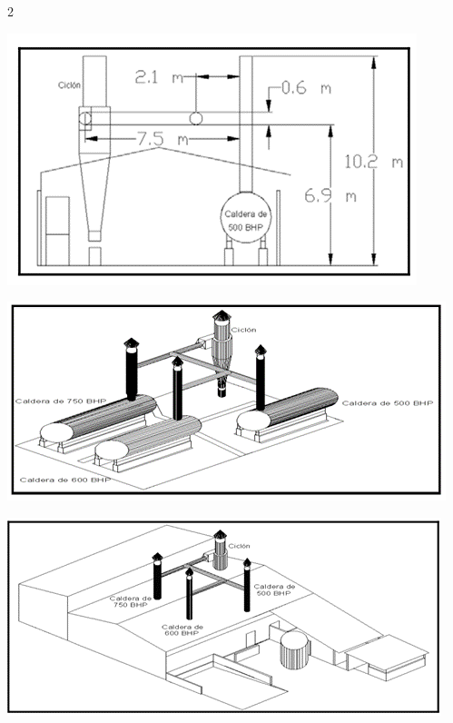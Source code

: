 \documentclass[12pt,spanish,Letterpaper,openany]{book}
\begin{document}
\begin {multicols}{2}
\begin {flushleft}
\begin{minipage}[c]{\columnwidth}
\centering

\includegraphics[width=1\linewidth]{images/image15_wvaliente}

\centering

\includegraphics[width=1\linewidth]{images/image16_wvaliente}

\centering

\includegraphics[width=1\linewidth]{images/image17_wvaliente}

\end{minipage}


\end{flushleft}
\end{multicols}
\end{document}
